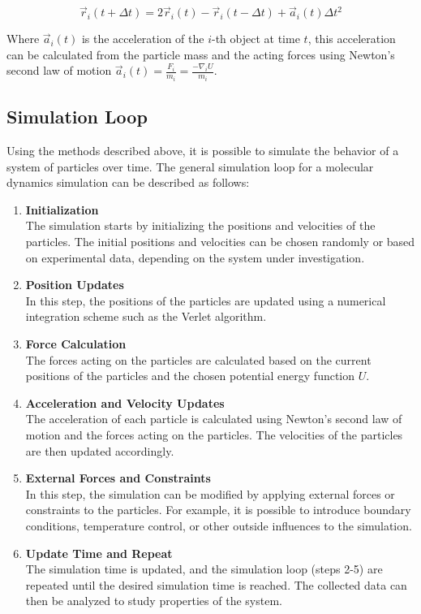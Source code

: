 \begin{equation}
      \vec{r}_i(t + \Delta t) = 2 \vec{r}_i(t) - \vec{r}_i(t - \Delta t) + \vec{a}_i(t) \Delta t^2
\end{equation}

Where $\vec{a}_i(t)$ is the acceleration of the $i$-th object at time $t$, this acceleration can be calculated from the particle mass and the acting forces using Newton's second law of motion $\vec{a}_i(t) =\frac{F_i}{m_i}= \frac{-\nabla_i U}{m_i}$.

\subsection{Simulation Loop}

Using the methods described above, it is possible to simulate the behavior of a system of particles over time. The general simulation loop for a molecular dynamics simulation can be described as follows:

\begin{enumerate}
      \item \textbf{Initialization} \\
            The simulation starts by initializing the positions and velocities of the particles. The initial positions and velocities can be chosen randomly or based on experimental data, depending on the system under investigation.

      \item \textbf{Position Updates} \\
            In this step, the positions of the particles are updated using a numerical integration scheme such as the Verlet algorithm.

      \item \textbf{Force Calculation} \\
            The forces acting on the particles are calculated based on the current positions of the particles and the chosen potential energy function $U$.

      \item \textbf{Acceleration and Velocity Updates} \\
            The acceleration of each particle is calculated using Newton's second law of motion and the forces acting on the particles. The velocities of the particles are then updated accordingly.

      \item \textbf{External Forces and Constraints} \\
            In this step, the simulation can be modified by applying external forces or constraints to the particles. For example, it is possible to introduce boundary conditions, temperature control, or other outside influences to the simulation.

      \item \textbf{Update Time and Repeat} \\
            The simulation time is updated, and the simulation loop (steps 2-5)
            are repeated until the desired simulation time is reached. The collected data can then be analyzed to study properties of the system.
\end{enumerate}


